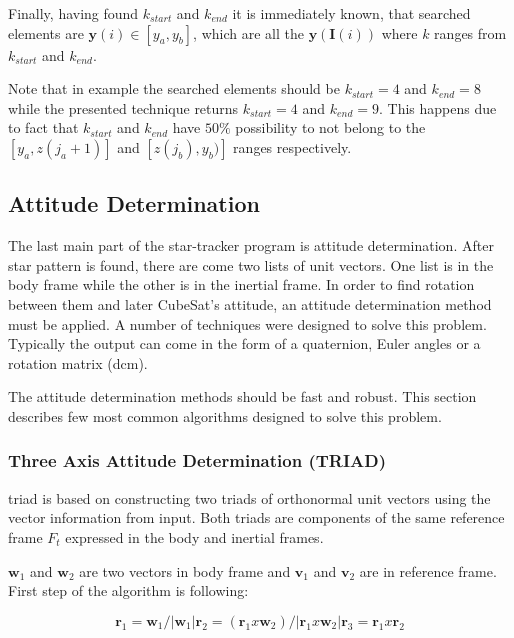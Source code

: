\documentclass[12pt,a4paper,twoside]{article}
\begin{document}
Finally, having found $k_{start}$ and $k_{end}$ it is immediately known, that searched elements are $\bm{y}(i) \in [y_a, y_b]$, which are all the $\bm{y}(\bm{I}(i))$ where $k$ ranges from $k_{start}$ and $k_{end}$.

Note that in example the searched elements should be $k_{start} = 4$ and $k_{end} = 8$ while the presented technique returns $k_{start} = 4$ and $k_{end} = 9$. This happens due to fact that $k_{start}$ and $k_{end}$ have $50\%$ possibility to not belong to the $[y_a, z(j_a +1)]$ and $[z(j_b), y_b)]$ ranges respectively.

\subsection{Attitude Determination}

The last main part of the star-tracker program is attitude determination. After star pattern is found, there are come two lists of unit vectors. One list is in the body frame while the other is in the inertial frame. In order to find rotation between them and later CubeSat's attitude, an attitude determination method must be applied. A number of techniques were designed to solve this problem. Typically the output can come in the form of a quaternion, Euler angles or a rotation matrix (\gls{dcm}).

The attitude determination methods should be fast and robust. This section describes few most common algorithms designed to solve this problem.


\subsubsection{Three Axis Attitude Determination (TRIAD)}

\gls{triad} is based on constructing two triads of orthonormal unit vectors using the vector information from input. Both triads are components of the same reference frame $F_t$ expressed in the body and inertial frames\cite{hall2003spacecraft}.

$\bm{w}_1$ and $\bm{w}_2$ are two vectors in body frame and $\bm{v}_1$ and $\bm{v}_2$ are in reference frame. First step of the algorithm is following:

\begin{subequations}
\begin{equation}
\bm{r}_1 = \bm{w}_1/|\bm{w}_1|
\end{equation}
\begin{equation}
\bm{r}_2 = (\bm{r}_1 x \bm{w}_2) /|\bm{r}_1 x \bm{w}_2|
\end{equation}
\begin{equation}
\bm{r}_3 = \bm{r}_1 x \bm{r}_2
\end{equation}
\end{subequations}
\end{document}
